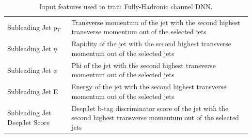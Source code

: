 \begin{table}[!htbp]
{\begin{tabular}{|p{4cm}|p{12cm}|}
Subleading Jet p$_T$ & Transverse momentum of the jet with the second highest transverse momentum out of the selected jets \\
Subleading Jet $\eta$ & Rapidity of the jet with the second highest transverse momentum out of the selected jets \\
Subleading Jet $\phi$ & Phi of the jet with the second highest transverse momentum out of the selected jets \\
Subleading Jet E & Energy of the jet with the second highest transverse momentum out of the selected jets \\
Subleading Jet DeepJet Score & DeepJet b-tag discriminator score of the jet with the second highest transverse momentum out of the selected jets \\
\hline
\end{tabular}
}

\caption{Input features used to train Fully-Hadronic channel DNN. \label{tab:FHDNNinputfeatures1}}
\end{table}

